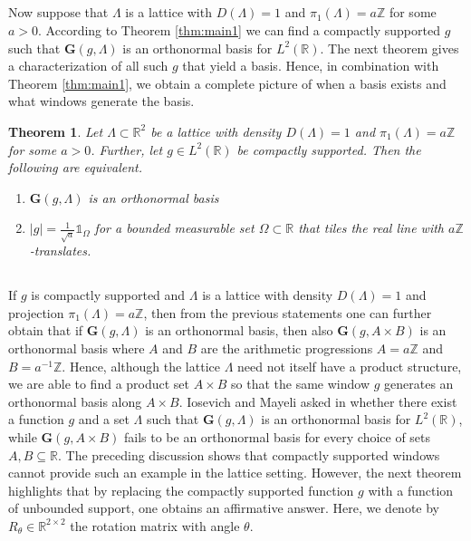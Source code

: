 \documentclass[reqno,a4paper,12pt]{amsart}
\numberwithin{equation}{section}
\newtheorem{theorem}[definition]{Theorem}
\def\Z{{\mathbb Z}}
\def\R{{\mathbb R}}
\newcommand{\lt}{{L^2(\R)}}
\newcommand\1{\mathds{1}}
\begin{document}
\subsection{}
Now suppose that $\Lambda$ is a lattice with $D(\Lambda)=1$ and $\pi_1(\Lambda) = a \Z$ for some $a>0$. According to Theorem \ref{thm:main1} we can find a compactly supported $g$ such that $\mathbf{G}(g,\Lambda)$ is an orthonormal basis for $\lt$. The next theorem gives a characterization of all such $g$ that yield a basis. Hence, in combination with Theorem \ref{thm:main1}, we obtain a complete picture of when a basis exists and what windows generate the basis.

\begin{theorem}\label{thm:main2}
    Let $\Lambda \subset \R^2$ be a lattice with density $D(\Lambda) = 1$ and $\pi_1(\Lambda) = a\Z$ for some $a>0$. Further, let $g \in \lt$ be compactly supported. Then the following are equivalent.
    \begin{enumerate}
        \item $\mathbf{G}(g,\Lambda)$ is an orthonormal basis
        \item $|g|=\frac{1}{\sqrt{a}} \1_\Omega$ for a bounded measurable set $\Omega \subset \R$ that tiles the real line with $a\Z$-translates.
    \end{enumerate}
\end{theorem}

\subsection{}
If $g$ is compactly supported and $\Lambda$ is a lattice with density $D(\Lambda)=1$ and projection $\pi_1(\Lambda) = a \Z$, then from the previous statements one can further obtain that if $\mathbf{G}(g,\Lambda)$ is an orthonormal basis, then also $\mathbf{G}(g,A \times B)$ is an orthonormal basis where $A$ and $B$ are the arithmetic progressions $A = a \Z$ and $B=a^{-1}\Z$. Hence, although the lattice $\Lambda$ need not itself have a product structure, we are able to find a product set $A \times B$ so that the same window $g$ generates an orthonormal basis along $A \times B$. Iosevich and Mayeli asked in \cite[Question 4.4]{IM18} whether there exist a function $g$ and a set $\Lambda$ such that $\mathbf{G}(g,\Lambda)$ is an orthonormal basis for $\lt$, while $\mathbf{G}(g,A\times B)$ fails to be an orthonormal basis for every choice of sets $A,B\subseteq\R$. The preceding discussion shows that compactly supported windows cannot provide such an example in the lattice setting. However, the next theorem highlights that by replacing the compactly supported function $g$ with a function of unbounded support, one obtains an affirmative answer. Here, we denote by $R_\theta \in \R^{2 \times 2}$ the rotation matrix with angle $\theta$.
\end{document}
